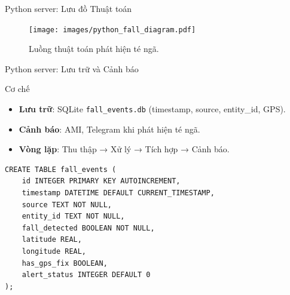\begin{frame}[fragile]{Python server: Lưu đồ Thuật toán}
    \begin{figure}
        \centering
        \texttt{[image: images/python\_fall\_diagram.pdf]}
        \caption{Luồng thuật toán phát hiện té ngã.}
        \label{fig:python_fall_diagram}
    \end{figure}
\end{frame}

\begin{frame}[fragile]{Python server: Lưu trữ và Cảnh báo}
    \begin{block}{Cơ chế}
        \begin{itemize}
            \item \textbf{Lưu trữ}: SQLite \texttt{fall\_events.db} (timestamp, source, entity\_id, GPS).
            \item \textbf{Cảnh báo}: AMI, Telegram khi phát hiện té ngã.
            \item \textbf{Vòng lặp}: Thu thập → Xử lý → Tích hợp → Cảnh báo.
        \end{itemize}
    \end{block}
    \begin{verbatim}
CREATE TABLE fall_events (
    id INTEGER PRIMARY KEY AUTOINCREMENT,
    timestamp DATETIME DEFAULT CURRENT_TIMESTAMP,
    source TEXT NOT NULL,
    entity_id TEXT NOT NULL,
    fall_detected BOOLEAN NOT NULL,
    latitude REAL,
    longitude REAL,
    has_gps_fix BOOLEAN,
    alert_status INTEGER DEFAULT 0
);
    \end{verbatim}
    \label{subsubsec:data_storage_alerts}
\end{frame}
